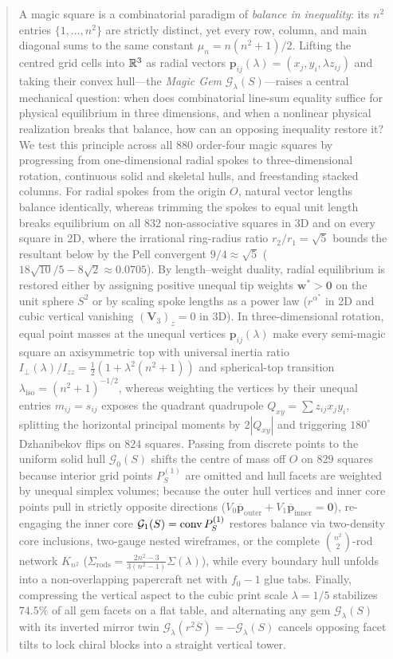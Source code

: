 \begin{abstract}
A magic square is a combinatorial paradigm of \emph{balance in inequality}: its $n^2$ entries $\{1,\dots,n^2\}$ are strictly distinct, yet every row, column, and main diagonal sums to the same constant $\mu_n=n(n^2+1)/2$. Lifting the centred grid cells into $\R^3$ as radial vectors $\mathbf p_{ij}(\lambda)=(x_j,y_i,\lambda z_{ij})$ and taking their convex hull—the \emph{Magic Gem} $\mathcal G_\lambda(S)$—raises a central mechanical question: when does combinatorial line-sum equality suffice for physical equilibrium in three dimensions, and when a nonlinear physical realization breaks that balance, how can an opposing inequality restore it? We test this principle across all $880$ order-four magic squares by progressing from one-dimensional radial spokes to three-dimensional rotation, continuous solid and skeletal hulls, and freestanding stacked columns. For radial spokes from the origin $O$, natural vector lengths balance identically, whereas trimming the spokes to equal unit length breaks equilibrium on all $832$ non-associative squares in 3D and on every square in 2D, where the irrational ring-radius ratio $r_2/r_1=\sqrt{5}$ bounds the resultant below by the Pell convergent $9/4\approx\sqrt{5}$ ($18\sqrt{10}/5-8\sqrt{2}\approx0.0705$). By length--weight duality, radial equilibrium is restored either by assigning positive unequal tip weights $\mathbf w^*>\mathbf 0$ on the unit sphere $S^2$ or by scaling spoke lengths as a power law ($r^{\alpha^*}$ in 2D and cubic vertical vanishing $(\mathbf V_3)_z=0$ in 3D). In three-dimensional rotation, equal point masses at the unequal vertices $\mathbf p_{ij}(\lambda)$ make every semi-magic square an axisymmetric top with universal inertia ratio $I_\perp(\lambda)/I_{zz}=\frac12(1+\lambda^2(n^2+1))$ and spherical-top transition $\lambda_{\mathrm{iso}}=(n^2+1)^{-1/2}$, whereas weighting the vertices by their unequal entries $m_{ij}=s_{ij}$ exposes the quadrant quadrupole $Q_{xy}=\sum z_{ij}x_jy_i$, splitting the horizontal principal moments by $2|Q_{xy}|$ and triggering $180^\circ$ Dzhanibekov flips on $824$ squares. Passing from discrete points to the uniform solid hull $\mathcal G_0(S)$ shifts the centre of mass off $O$ on $829$ squares because interior grid points $P_S^{(1)}$ are omitted and hull facets are weighted by unequal simplex volumes; because the outer hull vertices and inner core points pull in strictly opposite directions ($V_0\overline{\mathbf p}_{\mathrm{outer}}+V_1\overline{\mathbf p}_{\mathrm{inner}}=\mathbf 0$), re-engaging the inner core $\mathcal G_1(S)=\conv P_S^{(1)}$ restores balance via two-density core inclusions, two-gauge nested wireframes, or the complete $\binom{n^2}{2}$-rod network $K_{n^2}$ ($\Sigma_{\mathrm{rods}}=\frac{2n^2-3}{3(n^2-1)}\Sigma(\lambda)$), while every boundary hull unfolds into a non-overlapping papercraft net with $f_0-1$ glue tabs. Finally, compressing the vertical aspect to the cubic print scale $\lambda=1/5$ stabilizes $74.5\%$ of all gem facets on a flat table, and alternating any gem $\mathcal G_\lambda(S)$ with its inverted mirror twin $\mathcal G_\lambda(r^2\overline S)=-\mathcal G_\lambda(S)$ cancels opposing facet tilts to lock chiral blocks into a straight vertical tower.


\end{abstract}
